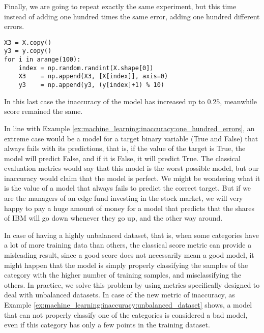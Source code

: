 \begin{example}
Finally, we are going to repeat exactly the same experiment, but this time instead of adding one hundred times the same error, adding one hundred different errors.

\begin{sourcecode}
{\scriptsize \begin{verbatim}
X3 = X.copy()
y3 = y.copy()
for i in arange(100):
    index = np.random.randint(X.shape[0])
    X3    = np.append(X3, [X[index]], axis=0)
    y3    = np.append(y3, (y[index]+1) % 10)
\end{verbatim}}
\end{sourcecode}

In this last case the inaccuracy of the model has increased up to $0.25$, meanwhile score remained the same.
\end{example}

In line with Example \ref{ex:machine_learning:inaccuracy:one_hundred_errors}, an extreme case would be a model for a target binary variable (True and False) that always fails with its predictions, that is, if the value of the target is True, the model will predict False, and if it is False, it will predict True. The classical evaluation metrics would say that this model is the worst possible model, but our inaccuracy would claim that the model is perfect. We might be wondering what it is the value of a model that always fails to predict the correct target. But if we are the managers of an edge fund investing in the stock market, we will very happy to pay a huge amount of money for a model that predicts that the shares of IBM will go down whenever they go up, and the other way around.

In case of having a highly unbalanced dataset, that is, when some categories have a lot of more training data than others, the classical score metric can provide a misleading result, since a good score does not necessarily mean a good model, it might happen that the model is simply properly classifying the samples of the category with the higher number of training samples, and misclassifying the others. In practice, we solve this problem by using metrics specifically designed to deal with unbalanced datasets. In case of the new metric of inaccuracy, as Example \ref{ex:machine_learning:inaccuracy:unbalanced_dataset} shows, a model that can not properly classify one of the categories is considered a bad model, even if this category has only a few points in the training dataset.

